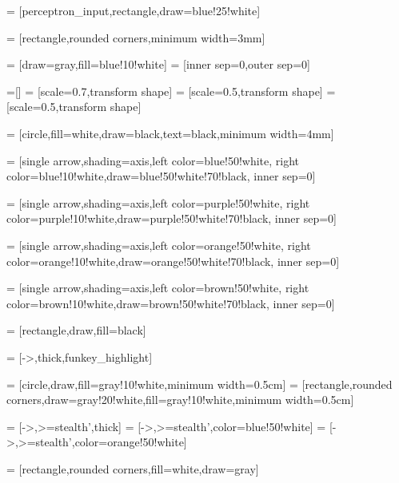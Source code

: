 =
  [perceptron_input,rectangle,draw=blue!25!white]

=
  [rectangle,rounded corners,minimum width=3mm]

=
  [draw=gray,fill=blue!10!white]
=
  [inner sep=0,outer sep=0]

=[]
=
  [scale=0.7,transform shape]
=
  [scale=0.5,transform shape]
=
  [scale=0.5,transform shape]

=
  [circle,fill=white,draw=black,text=black,minimum width=4mm]

=
  [single arrow,shading=axis,left color=blue!50!white, right color=blue!10!white,draw=blue!50!white!70!black, inner sep=0]

=
  [single arrow,shading=axis,left color=purple!50!white, right color=purple!10!white,draw=purple!50!white!70!black, inner sep=0]

=
  [single arrow,shading=axis,left color=orange!50!white, right color=orange!10!white,draw=orange!50!white!70!black, inner sep=0]

=
  [single arrow,shading=axis,left color=brown!50!white, right color=brown!10!white,draw=brown!50!white!70!black, inner sep=0]

=
  [rectangle,draw,fill=black]


=
  [->,thick,funkey_highlight]

=
  [circle,draw,fill=gray!10!white,minimum width=0.5cm]
=
  [rectangle,rounded corners,draw=gray!20!white,fill=gray!10!white,minimum width=0.5cm]

=
  [->,>=stealth',thick]
=
  [->,>=stealth',color=blue!50!white]
=
  [->,>=stealth',color=orange!50!white]

=
  [rectangle,rounded corners,fill=white,draw=gray]


\newcommand{\getzoomfactor}{%
\pgfgettransformentries{\myxscale}{\@tempa}{\@tempa}{\myyscale}{\@tempa}{\@tempa}
\gdef\zoomfactor{\myxscale}
}

\def\scalebar#1#2{%
  \fill[black] (0,0) rectangle ($(#1,-#1*0.2)$);
  \path (0,0) -- node[above] {#2} (#1,0);
}
